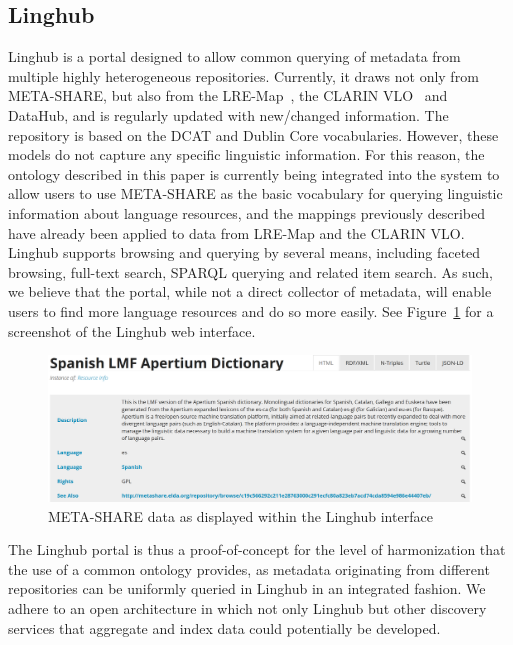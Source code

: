 \documentclass{llncs}
\begin{document}
\subsection{Linghub}

Linghub is a portal designed to allow common querying of metadata from multiple
highly heterogeneous repositories. Currently, it draws not only
from META-SHARE, but also from the LRE-Map~\cite{calzolari2012lre}, the CLARIN
VLO~\cite{broeder2010data} and DataHub, and is regularly updated with new/changed information. The repository is based on the DCAT and Dublin Core vocabularies. However, these models do not capture
any specific linguistic information. For this reason, the ontology described in this paper is currently being integrated into the system to allow users to use META-SHARE as the
basic vocabulary for querying linguistic information about language resources, and the mappings previously
described have already been applied to data from LRE-Map and the CLARIN VLO.
Linghub supports browsing and querying by several means, including faceted
browsing, full-text search, SPARQL querying and related item search. As such, we
believe that the portal, while not a direct collector of metadata, will enable
users to find more language resources and do so more easily. See Figure~\ref{fig:screenshot} for a screenshot of the Linghub web interface.

\begin{figure}
    \centering
    \includegraphics[width=.9\textwidth]{linghub-screenshot.png}
    \caption{META-SHARE data as displayed within the Linghub
    interface\label{fig:screenshot}}
\end{figure}

The Linghub portal is thus a proof-of-concept for the level of
harmonization that the use of a common ontology provides, as metadata
originating from different repositories can be uniformly queried in Linghub in
an integrated fashion. We adhere to an open architecture in which not only
Linghub but other discovery services that aggregate and index data could potentially
be developed.
\end{document}
